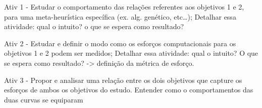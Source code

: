 Ativ 1 - Estudar o comportamento das relações referentes aos objetivos 1 e 2, para uma meta-heurística específica (ex. alg. genético, etc…);
Detalhar essa atividade: qual o intuito? o que se espera como resultado?

Ativ 2 - Estudar e definir o modo como os esforços computacionais para os objetivos 1 e 2 podem ser medidos;
Detalhar essa atividade: qual o intuito? O que se espera como resultado? -> definição da métrica de esforço.

Ativ 3 - Propor e analisar uma relação entre os dois objetivos que capture os esforços de ambos os objetivos do estudo.
Entender como o comportamentos das duas curvas se equiparam





